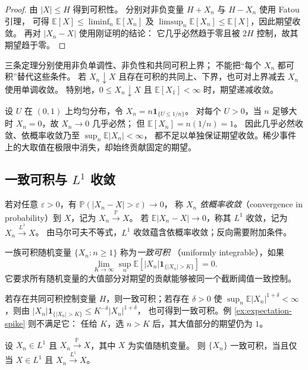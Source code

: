 \documentclass[UTF8,12pt,a4paper,fontset=fandol]{ctexart}
\begin{document}
\begin{proof}
由 $|X|\leq H$ 得到可积性。
分别对非负变量 $H+X_n$ 与 $H-X_n$ 使用 Fatou 引理，
可得 $\mathbb E[X]\leq\liminf_n\mathbb E[X_n]$
及 $\limsup_n\mathbb E[X_n]\leq\mathbb E[X]$，因此期望收敛。
再对 $|X_n-X|$ 使用刚证明的结论：
它几乎必然趋于零且被 $2H$ 控制，故其期望趋于零。
\end{proof}

三条定理分别使用非负单调性、非负性和共同可积上界；
不能把“每个 $X_n$ 都可积”替代这些条件。
若 $X_n\downarrow X$ 且存在可积的共同上、下界，也可对上界减去 $X_n$ 使用单调收敛。
特别地，$0\leq X_n\downarrow X$ 且 $\mathbb E[X_1]<\infty$ 时，期望递减收敛。

\begin{example}[几乎必然收敛仍可能丢失期望]
\label{ex:expectation-spike}
设 $U$ 在 $(0,1)$ 上均匀分布，令
$X_n=n\mathbf1_{\{U\leq1/n\}}$。
对每个 $U>0$，当 $n$ 足够大时 $X_n=0$，故 $X_n\to0$ 几乎必然；
但 $\mathbb E[X_n]=n(1/n)=1$。
因此几乎必然收敛、依概率收敛乃至 $\sup_n\mathbb E|X_n|<\infty$，
都不足以单独保证期望收敛。稀少事件上的大取值在极限中消失，却始终贡献固定的期望。
\end{example}

\subsection{一致可积与 \texorpdfstring{$L^1$}{L1} 收敛}

若对任意 $\varepsilon>0$，有 $\mathbb P(|X_n-X|>\varepsilon)\to0$，
称 $X_n$ \emph{依概率收敛}（convergence in probability）到 $X$，记为 $X_n\xrightarrow{\mathbb P}X$。
若 $\mathbb E|X_n-X|\to0$，称其 $L^1$ 收敛，记为 $X_n\xrightarrow{L^1}X$。
由马尔可夫不等式，$L^1$ 收敛蕴含依概率收敛；反向需要附加条件。

\begin{definition}[一致可积]
\label{def:expectation-ui}
一族可积随机变量 $\{X_n:n\geq1\}$ 称为\emph{一致可积}
（uniformly integrable），如果
\[
  \lim_{K\to\infty}\sup_n
  \mathbb E[|X_n|\mathbf1_{\{|X_n|>K\}}]=0.
\]
它要求所有随机变量的大值部分对期望的贡献能够被同一个截断阈值一致控制。
\end{definition}

若存在共同可积控制变量 $H$，则一致可积；若存在 $\delta>0$ 使
$\sup_n\mathbb E|X_n|^{1+\delta}<\infty$，则由
$|X_n|\mathbf1_{\{|X_n|>K\}}\leq K^{-\delta}|X_n|^{1+\delta}$，
也可得到一致可积。例 \ref{ex:expectation-spike} 则不满足它：
任给 $K$，选 $n>K$ 后，其大值部分的期望仍为 $1$。

\begin{theorem}[一致可积的收敛判据]
\label{thm:expectation-ui}
设 $X_n\in L^1$ 且 $X_n\xrightarrow{\mathbb P}X$，其中 $X$ 为实值随机变量。
则 $\{X_n\}$ 一致可积，当且仅当 $X\in L^1$ 且 $X_n\xrightarrow{L^1}X$。
\end{theorem}
\end{document}
